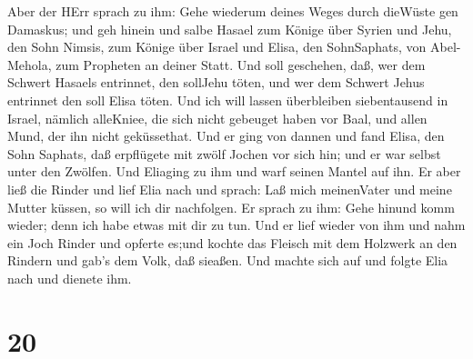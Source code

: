  Aber der HErr sprach zu ihm: Gehe wiederum deines Weges
durch dieWüste gen Damaskus; und geh hinein und salbe Hasael zum Könige
über Syrien  und Jehu, den Sohn Nimsis, zum Könige über
Israel und Elisa, den SohnSaphats, von Abel-Mehola, zum Propheten an
deiner Statt.  Und soll geschehen, daß, wer dem Schwert
Hasaels entrinnet, den sollJehu töten, und wer dem Schwert Jehus
entrinnet den soll Elisa töten.  Und ich will lassen
überbleiben siebentausend in Israel, nämlich alleKniee, die sich nicht
gebeuget haben vor Baal, und allen Mund, der ihn nicht geküssethat.
 Und er ging von dannen und fand Elisa, den Sohn Saphats,
daß erpflügete mit zwölf Jochen vor sich hin; und er war selbst unter
den Zwölfen. Und Eliaging zu ihm und warf seinen Mantel auf ihn.
 Er aber ließ die Rinder und lief Elia nach und sprach: Laß
mich meinenVater und meine Mutter küssen, so will ich dir nachfolgen. Er
sprach zu ihm: Gehe hinund komm wieder; denn ich habe etwas mit dir zu
tun.  Und er lief wieder von ihm und nahm ein Joch Rinder
und opferte es;und kochte das Fleisch mit dem Holzwerk an den Rindern
und gab's dem Volk, daß sieaßen. Und machte sich auf und folgte Elia
nach und dienete ihm.

\hypertarget{section-19}{%
\section{20}\label{section-19}}

